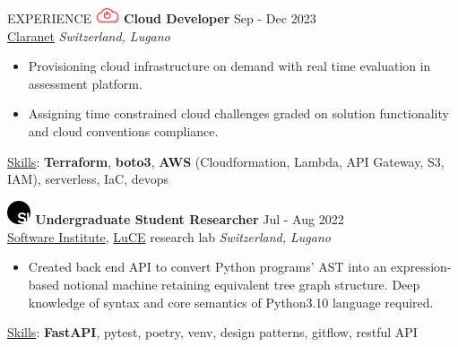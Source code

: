 \documentclass{cv} %
\def\intraexpvspace{0.15cm}
\def\titlelistvspace{-0.15cm}
\begin{document}
\begin{rSection}{EXPERIENCE}
    \includegraphics[width=0.7cm, trim={0cm 15cm 0cm 0cm}]{claranet-logo.png}
    \textbf{Cloud Developer} \hfill Sep - Dec 2023\\
    \hspace*{0.85cm}\href{https://www.claranet.com/}{Claranet}
    \hfill \textit{Switzerland, Lugano}
    \vspace{\titlelistvspace}\begin{itemize}
        \itemsep -3pt {}
        \item Provisioning cloud infrastructure on demand
              with real time evaluation in assessment platform.
        \item Assigning time constrained cloud challenges graded on solution functionality and cloud conventions compliance.
    \end{itemize}
    \vspace*{-0.1cm}\hspace*{0.5cm}\underline{Skills}: \textbf{Terraform},
    \textbf{boto3},
    \textbf{AWS} (Cloudformation, Lambda, API Gateway, S3, IAM), %
    serverless,
    IaC,
    devops
    \vspace{\intraexpvspace}

    \includegraphics[width=0.7cm, trim={0cm 10cm 0cm 0cm}]{si-icon.jpg}
    \hspace*{0cm}\textbf{Undergraduate Student Researcher} \hfill Jul - Aug 2022\\
    \hspace*{0.85cm}\href{https://www.si.usi.ch/}{Software Institute},
    \href{https://luce.si.usi.ch/}{LuCE} research lab
    \hfill \textit{Switzerland, Lugano}
    \vspace{\titlelistvspace}\begin{itemize}
        \itemsep -3pt {}
        \item Created back end API to convert Python programs' AST
              into an expression-based notional machine retaining equivalent tree graph structure.
              Deep knowledge of syntax and core semantics of Python3.10 language required.
    \end{itemize}
    \vspace*{-0.1cm}\hspace*{0.5cm}\underline{Skills}: \textbf{FastAPI}, pytest, poetry, venv, design patterns, gitflow, restful API
    \vspace{\intraexpvspace}


\end{rSection}
\end{document}
